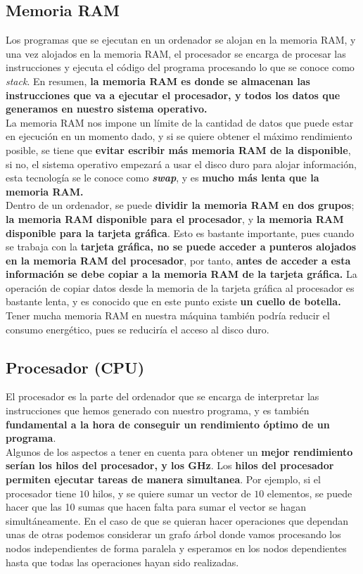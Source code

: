 \subsection{Memoria RAM}
Los programas que se ejecutan en un ordenador se alojan en la memoria RAM, y una vez alojados en la memoria RAM, el procesador se encarga de procesar las instrucciones y ejecuta el código del programa procesando lo que se conoce como \textit{stack}. En resumen, \textbf{la memoria RAM es donde se almacenan las instrucciones que va a ejecutar el procesador, y todos los datos que generamos en nuestro sistema operativo.}
\\ 
La memoria RAM nos impone un límite de la cantidad de datos que puede estar en ejecución en un momento dado, y si se quiere obtener el máximo rendimiento posible, se tiene que \textbf{evitar escribir más memoria RAM de la disponible}, si no, el sistema operativo empezará a usar el disco duro para alojar información, esta tecnología se le conoce como \textbf{\textit{swap}}, y es \textbf{mucho más lenta que la memoria RAM.}
\\ 
Dentro de un ordenador, se puede \textbf{dividir la memoria RAM en dos grupos}; \textbf{la memoria RAM disponible para el procesador}, y  \textbf{la memoria RAM disponible para la tarjeta gráfica}. Esto es bastante importante, pues cuando se trabaja con la \textbf{tarjeta gráfica, no se puede acceder a punteros alojados en la memoria RAM del procesador}, por tanto, \textbf{antes de acceder a esta información se debe copiar a la memoria RAM de la tarjeta gráfica.} La operación de copiar datos desde la memoria de la tarjeta gráfica al procesador es bastante lenta, y es conocido que en este punto existe \textbf{un cuello de botella.}
\\ 
Tener mucha memoria RAM en nuestra máquina también podría reducir el consumo energético, pues se reduciría el acceso al disco duro.

\subsection{Procesador (CPU)}
El procesador es la parte del ordenador que se encarga de interpretar las instrucciones que hemos generado con nuestro programa, y es también \textbf{fundamental a la hora de conseguir un rendimiento óptimo de un programa}. \\
Algunos de los aspectos a tener en cuenta para obtener un \textbf{mejor rendimiento serían los hilos del procesador, y los GHz}. Los \textbf{hilos del procesador permiten ejecutar tareas de manera simultanea}. Por ejemplo, si el procesador tiene $10$ hilos, y se quiere sumar un vector de $10$ elementos, se puede hacer que las 10 sumas que hacen falta para sumar el vector se hagan simultáneamente. En el caso de que se quieran hacer operaciones que dependan unas de otras podemos considerar un grafo árbol donde vamos procesando los nodos independientes de forma paralela y esperamos en los nodos dependientes hasta que todas las operaciones hayan sido realizadas.
